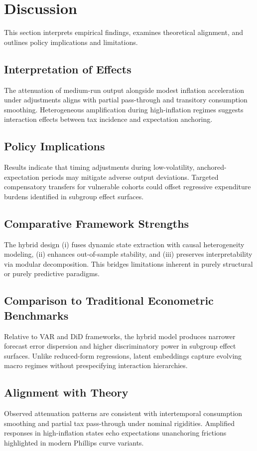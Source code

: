 \section{Discussion}\label{sec:discussion}
This section interprets empirical findings, examines theoretical alignment, and outlines policy implications and limitations.

\subsection{Interpretation of Effects}
The attenuation of medium-run output alongside modest inflation acceleration under \VAT{} adjustments aligns with partial pass-through and transitory consumption smoothing. Heterogeneous amplification during high-inflation regimes suggests interaction effects between tax incidence and expectation anchoring.

\subsection{Policy Implications}
Results indicate that timing \VAT{} adjustments during low-volatility, anchored-expectation periods may mitigate adverse output deviations. Targeted compensatory transfers for vulnerable cohorts could offset regressive expenditure burdens identified in subgroup effect surfaces.

\subsection{Comparative Framework Strengths}
The hybrid design (i) fuses dynamic state extraction with causal heterogeneity modeling, (ii) enhances out-of-sample stability, and (iii) preserves interpretability via modular decomposition. This bridges limitations inherent in purely structural or purely predictive paradigms.

\subsection{Comparison to Traditional Econometric Benchmarks}
Relative to VAR and DiD frameworks, the hybrid model produces narrower forecast error dispersion and higher discriminatory power in subgroup effect surfaces. Unlike reduced-form regressions, latent embeddings capture evolving macro regimes without prespecifying interaction hierarchies.

\subsection{Alignment with Theory}
Observed attenuation patterns are consistent with intertemporal consumption smoothing and partial tax pass-through under nominal rigidities. Amplified responses in high-inflation states echo expectations unanchoring frictions highlighted in modern Phillips curve variants.

